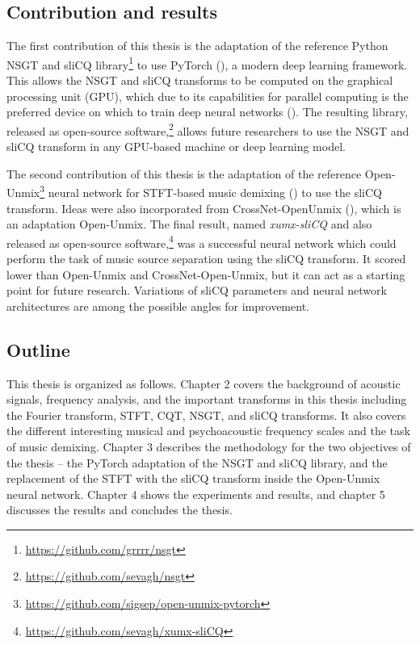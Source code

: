 \documentclass[report.tex]{subfiles}
\begin{document}
\subsection{Contribution and results}

The first contribution of this thesis is the adaptation of the reference Python NSGT and sliCQ library\footnote{\url{https://github.com/grrrr/nsgt}} to use PyTorch (\cite{pytorch}), a modern deep learning framework. This allows the NSGT and sliCQ transforms to be computed on the graphical processing unit (GPU), which due to its capabilities for parallel computing is the preferred device on which to train deep neural networks (\cite{pytorch}). The resulting library, released as open-source software,\footnote{\url{https://github.com/sevagh/nsgt}} allows future researchers to use the NSGT and sliCQ transform in any GPU-based machine or deep learning model.

The second contribution of this thesis is the adaptation of the reference Open-Unmix\footnote{\url{https://github.com/sigsep/open-unmix-pytorch}} neural network for STFT-based music demixing (\cite{umx}) to use the sliCQ transform. Ideas were also incorporated from CrossNet-OpenUnmix (\cite{xumx}), which is an adaptation Open-Unmix. The final result, named \textit{xumx-sliCQ} and also released as open-source software,\footnote{\url{https://github.com/sevagh/xumx-sliCQ}} was a successful neural network which could perform the task of music source separation using the sliCQ transform. It scored lower than Open-Unmix and CrossNet-Open-Unmix, but it can act as a starting point for future research. Variations of sliCQ parameters and neural network architectures are among the possible angles for improvement.

\subsection{Outline}

This thesis is organized as follows. Chapter 2 covers the background of acoustic signals, frequency analysis, and the important transforms in this thesis including the Fourier transform, STFT, CQT, NSGT, and sliCQ transforms. It also covers the different interesting musical and psychoacoustic frequency scales and the task of music demixing. Chapter 3 describes the methodology for the two objectives of the thesis -- the PyTorch adaptation of the NSGT and sliCQ library, and the replacement of the STFT with the sliCQ transform inside the Open-Unmix neural network. Chapter 4 shows the experiments and results, and chapter 5 discusses the results and concludes the thesis.
\end{document}
